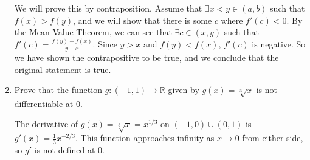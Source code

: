 \documentclass[11pt]{article}
\newcommand{\R}{\mathbb{R}}
\begin{document}
\begin{enumerate}
We will prove this by contraposition. Assume that $\exists x<y\in(a,b)$
such that $f(x)>f(y)$, and we will show that there is some $c$ where
$f'(c)<0$. By the Mean Value Theorem, we can see that $\exists c\in(x,y)$
such that $f'(c)=\frac{f(y)-f(x)}{y-x}$. Since $y>x$ and $f(y)<f(x)$,
$f'(c)$ is negative. So we have shown the contrapositive to be true,
and we conclude that the original statement is true.

\item{Prove that the function $g:(-1,1)\to\R$ given by $g(x)=\sqrt[3]{x}$
is not differentiable at 0.}

The derivative of $g(x)=\sqrt[3]{x}=x^{1/3}$ on $(-1,0)\cup(0,1)$ is
$g'(x)=\frac{1}{3}x^{-2/3}$. This function approaches infinity
as $x\to0$ from either side, so $g'$ is not defined at 0.



\end{enumerate}
\end{document}
